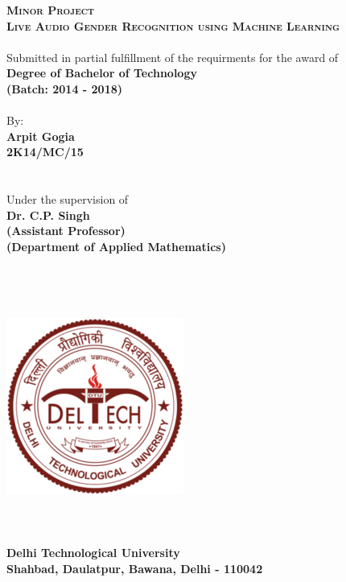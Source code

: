 \documentclass[12pt]{article}
\begin{document}
	\begin{titlepage}
		\centering
		\textsc{\huge \textbf{Minor Project}}\\[1.5cm]
		\textsc{\Large \textbf{Live Audio Gender Recognition using Machine Learning}}\\[0.5cm]
		\textnormal{\\Submitted in partial fulfillment of the requirments for the award of}
		\textnormal{\textbf{\\Degree of Bachelor of Technology}}
		\textnormal{\textbf{\\(Batch: 2014 - 2018)}}
		\textnormal{\\}
		\textnormal{\\By:}
		\textnormal{\\\textbf{Arpit Gogia}}
		\textnormal{\\\textbf{2K14/MC/15}}
		\textnormal{\\}
		\textnormal{\\}
		\textnormal{\\}
		\textnormal{Under the supervision of}
		\textnormal{\\\textbf{Dr. C.P. Singh}}
		\textnormal{\\\textbf{(Assistant Professor)}}
		\textnormal{\\\textbf{(Department of Applied Mathematics)}}
		\textnormal{\\}
		\textnormal{\\}
		\textnormal{\\}
		\textnormal{\\}
		\textnormal{\\}
		\includegraphics{logo}
		\textnormal{\\}
		\textnormal{\\}
		\textnormal{\\}
		\textnormal{\\\textbf{Delhi Technological University}}
		\textnormal{\\\textbf{Shahbad, Daulatpur, Bawana, Delhi - 110042}}
		\pagebreak
	\end{titlepage}
\end{document}
